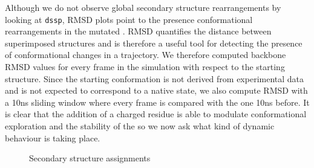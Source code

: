 Although we do not observe global secondary structure rearrangements by looking at \texttt{dssp}, RMSD plots point to the presence conformational rearrangements in the mutated \gct{}. RMSD quantifies the distance between superimposed structures and is therefore a useful tool for detecting the presence of conformational changes in a trajectory. We therefore computed backbone RMSD values for every frame in the simulation with respect to the starting structure. Since the starting conformation is not derived from experimental data and is not expected to correspond to a native state, we also compute RMSD with a 10ns sliding window where every frame is compared with the one 10ns before.  It is clear that the addition of a charged residue is able to modulate conformational exploration and the stability of the \gct{} so we now ask what kind of dynamic behaviour is taking place. 



\begin{figure}
	\centering     %
	\caption{Secondary structure assignments}
\end{figure}
	
